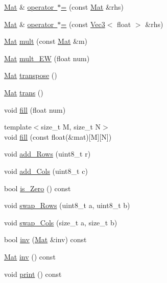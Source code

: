 \begin{DoxyCompactItemize}
\mbox{\hyperlink{class_mat}{Mat}} \& \mbox{\hyperlink{class_mat_aaf9946bb579ab98e5f1b3c554da11cc9}{operator $\ast$=}} (const \mbox{\hyperlink{class_mat}{Mat}} \&rhs)
\item 
\mbox{\hyperlink{class_mat}{Mat}} \& \mbox{\hyperlink{class_mat_a8f508e70094f29bf8bd428e3d41013e8}{operator $\ast$=}} (const \mbox{\hyperlink{class_vec3}{Vec3}}$<$ float $>$ \&rhs)
\item 
\mbox{\hyperlink{class_mat}{Mat}} \mbox{\hyperlink{class_mat_a03d3322fef7fcc6d52fe141171c5fa04}{mult}} (const \mbox{\hyperlink{class_mat}{Mat}} \&m)
\item 
\mbox{\hyperlink{class_mat}{Mat}} \mbox{\hyperlink{class_mat_a1de36bf60c84341c1f94494a4d42e5aa}{mult\+\_\+\+EW}} (float num)
\item 
\mbox{\hyperlink{class_mat}{Mat}} \mbox{\hyperlink{class_mat_a55e6cc33fc65042a4cff351fe59ae476}{transpose}} ()
\item 
\mbox{\hyperlink{class_mat}{Mat}} \mbox{\hyperlink{class_mat_aa2864c30e68caf29f400bb98295aa6a3}{trans}} ()
\item 
void \mbox{\hyperlink{class_mat_abadfedd9dc62cb060771a03ac40c7340}{fill}} (float num)
\item 
{\footnotesize template$<$size\+\_\+t M, size\+\_\+t N$>$ }\\void \mbox{\hyperlink{class_mat_af95f54284a8d4937918dadb347e76a13}{fill}} (const float(\&mat)\mbox{[}M\mbox{]}\mbox{[}N\mbox{]})
\item 
void \mbox{\hyperlink{class_mat_ae5b6c8fc154b2ac9707c5312a94215f9}{add\+\_\+\+Rows}} (uint8\+\_\+t r)
\item 
void \mbox{\hyperlink{class_mat_a3fc332affd01fd294aa98550b88c819d}{add\+\_\+\+Cols}} (uint8\+\_\+t c)
\item 
bool \mbox{\hyperlink{class_mat_a1faaf46898f55a59d5e27baf7c4a028b}{is\+\_\+\+Zero}} () const
\item 
void \mbox{\hyperlink{class_mat_a410c3755a4d91c1ef2bbe3fed93fbb00}{swap\+\_\+\+Rows}} (uint8\+\_\+t a, uint8\+\_\+t b)
\item 
void \mbox{\hyperlink{class_mat_af942681667806bc48eecd8f793e35c3b}{swap\+\_\+\+Cols}} (size\+\_\+t a, size\+\_\+t b)
\item 
bool \mbox{\hyperlink{class_mat_a22ba19e51a04cbf9211b070b696ae399}{inv}} (\mbox{\hyperlink{class_mat}{Mat}} \&inv) const
\item 
\mbox{\hyperlink{class_mat}{Mat}} \mbox{\hyperlink{class_mat_a8655dfdd2bcf36aeb250f71b746632c3}{inv}} () const
\item 
void \mbox{\hyperlink{class_mat_af08e1d54e7ec9d23663a65591634be0d}{print}} () const
\end{DoxyCompactItemize}
